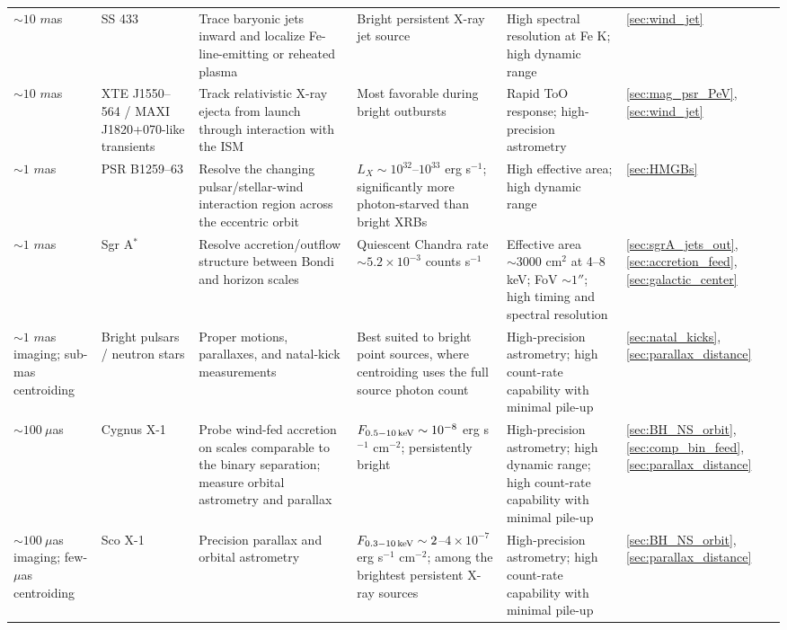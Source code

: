 \documentclass{article}
\begin{document}
\begin{table}
{\begin{tabular}{L{2.2cm} L{2.5cm} L{4.0cm} L{3.5cm} L{4.2cm} L{1.5cm}}
$\sim10$ $m$as &
SS 433 &
Trace baryonic jets inward and localize Fe-line-emitting or reheated plasma &
Bright persistent X-ray jet source &
High spectral resolution at Fe K; high dynamic range &
\ref{sec:wind_jet} \\

$\sim10$ $m$as &
XTE J1550--564 / MAXI J1820+070-like transients &
Track relativistic X-ray ejecta from launch through interaction with the ISM &
Most favorable during bright outbursts &
Rapid ToO response; high-precision astrometry &
\ref{sec:mag_psr_PeV}, \ref{sec:wind_jet} \\ \hline

$\sim1$ $m$as &
PSR B1259--63 &
Resolve the changing pulsar/stellar-wind interaction region across the eccentric orbit &
$L_X\sim10^{32}$--$10^{33}$ erg s$^{-1}$; significantly more photon-starved than bright XRBs &
High effective area; high dynamic range &
\ref{sec:HMGBs} \\

$\sim1$ $m$as &
Sgr A$^*$ &
Resolve accretion/outflow structure between Bondi and horizon scales &
Quiescent Chandra rate $\sim5.2\times10^{-3}$ counts s$^{-1}$ &
Effective area $\sim3000$ cm$^2$ at 4--8 keV; FoV $\sim1''$; high timing and spectral resolution &
\ref{sec:sgrA_jets_out}, \ref{sec:accretion_feed}, \ref{sec:galactic_center} \\

$\sim1$ $m$as imaging; sub-mas centroiding &
Bright pulsars / neutron stars &
Proper motions, parallaxes, and natal-kick measurements &
Best suited to bright point sources, where centroiding uses the full source photon count &
High-precision astrometry; high count-rate capability with minimal pile-up &
\ref{sec:natal_kicks}, \ref{sec:parallax_distance} \\ \hline

$\sim100~\mu$as &
Cygnus X-1 &
Probe wind-fed accretion on scales comparable to the binary separation; measure orbital astrometry and parallax &
$F_{0.5-10\,{\rm keV}}\sim10^{-8}$ erg s$^{-1}$ cm$^{-2}$; persistently bright &
High-precision astrometry; high dynamic range; high count-rate capability with minimal pile-up &
\ref{sec:BH_NS_orbit}, \ref{sec:comp_bin_feed}, \ref{sec:parallax_distance} \\

$\sim100~\mu$as imaging; few-$\mu$as centroiding &
Sco X-1 &
Precision parallax and orbital astrometry &
$F_{0.3-10\,{\rm keV}}\sim2$--$4\times10^{-7}$ erg s$^{-1}$ cm$^{-2}$; among the brightest persistent X-ray sources &
High-precision astrometry; high count-rate capability with minimal pile-up &
\ref{sec:BH_NS_orbit}, \ref{sec:parallax_distance} \\


\end{tabular}}
\end{table}
\end{document}
